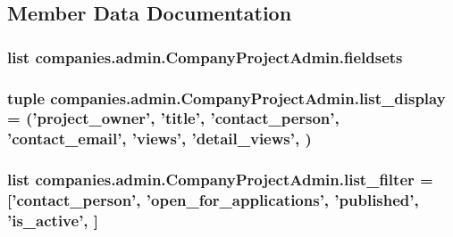 \subsection{Member Data Documentation}
\hypertarget{classcompanies_1_1admin_1_1_company_project_admin_aac14acbc97d6a3bff4a30ca24b0730b7}{
\subsubsection[{fieldsets}]{\setlength{\rightskip}{0pt plus 5cm}list companies.\-admin.\-Company\-Project\-Admin.\-fieldsets\hspace{0.3cm}{\ttfamily [static]}}}\label{classcompanies_1_1admin_1_1_company_project_admin_aac14acbc97d6a3bff4a30ca24b0730b7}
\hypertarget{classcompanies_1_1admin_1_1_company_project_admin_a51df8a0e3c3c014323e83d2805eeac46}{
\subsubsection[{list\-\_\-display}]{\setlength{\rightskip}{0pt plus 5cm}tuple companies.\-admin.\-Company\-Project\-Admin.\-list\-\_\-display = ('project\-\_\-owner', 'title', 'contact\-\_\-person', 'contact\-\_\-email', 'views', 'detail\-\_\-views', )\hspace{0.3cm}{\ttfamily [static]}}}\label{classcompanies_1_1admin_1_1_company_project_admin_a51df8a0e3c3c014323e83d2805eeac46}
\hypertarget{classcompanies_1_1admin_1_1_company_project_admin_a715870590cfb29621cbe719e200deba8}{
\subsubsection[{list\-\_\-filter}]{\setlength{\rightskip}{0pt plus 5cm}list companies.\-admin.\-Company\-Project\-Admin.\-list\-\_\-filter = \mbox{[}'contact\-\_\-person', 'open\-\_\-for\-\_\-applications', 'published', 'is\-\_\-active', \mbox{]}\hspace{0.3cm}{\ttfamily [static]}}}\label{classcompanies_1_1admin_1_1_company_project_admin_a715870590cfb29621cbe719e200deba8}
